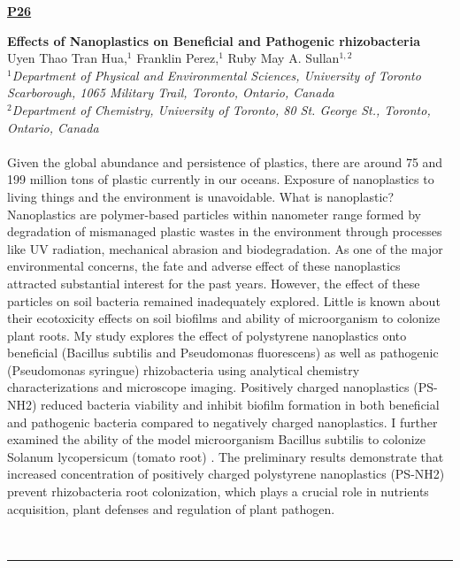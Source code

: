 \documentclass[titlepage,oneside,openany,10pt]{book}
\newenvironment{posterabs}[4] %
        {
	\begin{flushright}
                \underline{\textbf{#4}}
        \end{flushright}
        \textbf{#1}\\%
        #2\\%
        \textit{#3}\\\\%
        }
        {
        \\
        \noindent\rule{15cm}{0.5pt}%
        }
\begin{document}
\vspace{0.8cm}
\begin{posterabs}
	{Effects of Nanoplastics on Beneficial and Pathogenic rhizobacteria}
	{Uyen Thao Tran Hua,$^{1}$ Franklin Perez,$^{1}$ Ruby May A. Sullan$^{1,2}$}
	{
	$^1$Department of Physical and Environmental Sciences, University of Toronto Scarborough, 1065 Military Trail, Toronto, Ontario, Canada\\
	$^2$Department of Chemistry, University of Toronto, 80 St. George St., Toronto, Ontario, Canada
	}
	{P26}
	Given the global abundance and persistence of plastics, there are around 75 and 199 million tons of plastic currently in our oceans. Exposure of nanoplastics to living things and the environment is unavoidable. What is nanoplastic? Nanoplastics are polymer-based particles within nanometer range formed by degradation of mismanaged plastic wastes in the environment through processes like UV radiation, mechanical abrasion and biodegradation. As one of the major environmental concerns, the fate and adverse effect of these nanoplastics attracted substantial interest for the past years. However, the effect of these particles on soil bacteria remained inadequately explored. Little is known about their ecotoxicity effects on soil biofilms and ability of microorganism to colonize plant roots. My study explores the effect of polystyrene nanoplastics onto beneficial (Bacillus subtilis and Pseudomonas fluorescens) as well as pathogenic (Pseudomonas syringue) rhizobacteria using analytical chemistry characterizations and microscope imaging. Positively charged nanoplastics (PS-NH2) reduced bacteria viability and inhibit biofilm formation in both beneficial and pathogenic bacteria compared to negatively charged nanoplastics. I further examined the ability of the model microorganism Bacillus subtilis to colonize Solanum lycopersicum (tomato root) . The preliminary results demonstrate that increased concentration of positively charged polystyrene nanoplastics (PS-NH2) prevent rhizobacteria root colonization, which plays a crucial role in nutrients acquisition, plant defenses and regulation of plant pathogen.
	\label{HuaU}
\end{posterabs}

\newpage
\end{document}
